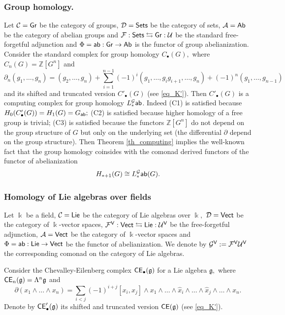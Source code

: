\documentclass{amsart}
\numberwithin{equation}{section}
\theoremstyle{definition}
\def\CC{\mathcal{C}}
\def\FF{\mathcal{F}}
\def\GG{\mathcal{G}}
\def\UU{\mathcal{U}}
\def\DD{\mathcal{D}}
\def\AA{\mathcal{A}}
\def\gg{\mathfrak{g}}
\def\kk{\Bbbk}
\def\ZZ{\mathbb{Z}}
\begin{document}
\subsubsection{Group homology.} Let $\CC={\sf Gr}$ be the category of groups, $\DD={\sf Sets}$ be the category of sets, $\AA={\sf Ab}$ be the category of abelian groups and $\FF: {\sf Sets} \leftrightarrows   {\sf Gr}:\UU$ be the standard free-forgetful adjunction and $\Phi={\sf ab}:{\sf Gr}\to {\sf Ab}$ is the functor of group abelianization. Consider the standard complex for group homology $C_\bullet(G),$ where 
$C_n(G)=\ZZ[G^n]$ and 
$$\partial_n(g_1,\dots,g_n)=(g_2,\dots,g_n)+ \sum_{i=1}^{n-1} (-1)^i (g_1,\dots,g_ig_{i+1},\dots,g_n) +(-1)^n (g_1,\dots,g_{n-1})$$ and its shifted and truncated version   
$C'_\bullet(G)$ (see \eqref{eq_K'}). Then $C'_\bullet(G)$
is a computing complex for group homology $L_*^\GG {\sf ab}$.  Indeed (C1) is satisfied because $H_0(C'_\bullet(G))=H_1(G)=G_{\sf ab};$ (C2) is satisfied because higher homology of a free group is trivial; (C3) is satisfied because the functors $\ZZ[G^n]$ do not depend on the group structure of $G$ but only on the underlying set (the differential $\partial$ depend on the group structure). Then Theorem \ref{th_computing} implies the well-known fact that the group homology coinsides with the 
comonad derived functors of the functor of abelianization \cite{quillen2006homotopical}
\begin{equation}
H_{*+1}(G)\cong L^\GG_*{\sf ab}(G).   
\end{equation}



\subsubsection{Homology of Lie algebras over fields} Let $\kk$ be a field, $\CC={\sf Lie}$ be the category of Lie algebras over $\kk,$ $\DD={\sf Vect}$ be the category of $\kk$-vector spaces, $\FF^{\sf V}: {\sf Vect} \leftrightarrows  {\sf Lie}:\UU^{\sf V}$ be the free-forgetful adjunction, $\AA={\sf Vect}$ be the category of $\kk$-vector spaces and $\Phi={\sf ab}:{\sf Lie}\to {\sf Vect}$ be the functor of abelianization. We denote by $\GG^{\sf V}:=\FF^{\sf V} \UU^{\sf V}$ the corresponding  comonad on the category of Lie algebras.


Consider the Chevalley-Eilenberg complex ${\sf CE}_\bullet(\gg)$ for a Lie algebra $\gg,$ where ${\sf CE}_n(\gg)=\Lambda^{n}\gg$  and 
$$\partial(x_1\wedge \dots \wedge x_{n} ) = \sum_{i<j} (-1)^{i+j} [x_i,x_j] \wedge x_1\wedge \dots \wedge \hat x_i \wedge \dots \wedge \hat x_j \wedge \dots \wedge x_n.$$ Denote by  ${\sf CE}'_\bullet(\gg)$ its shifted and truncated version ${\sf CE}(\gg)$ (see \eqref{eq_K'}).
\end{document}

